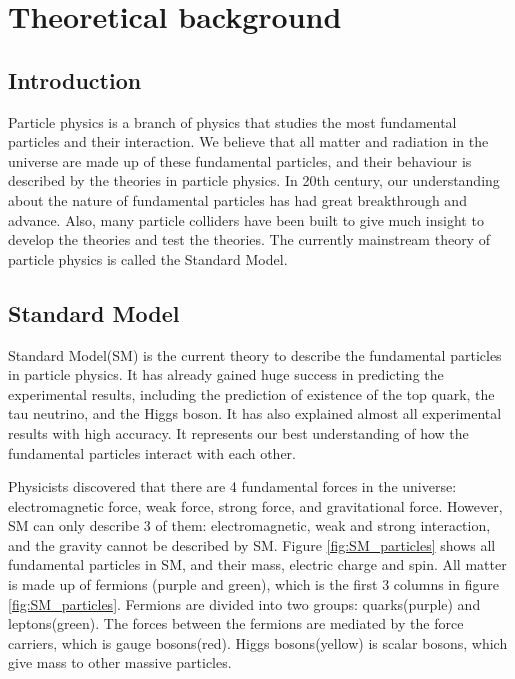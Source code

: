 \chapter{Theoretical background}
\label{ch:theory}

\section{Introduction}
Particle physics is a branch of physics that studies the most fundamental particles and their interaction.
We believe that all matter and radiation in the universe are made up of these fundamental particles, and their behaviour is described by the theories in particle physics.
In 20th century, our understanding about the nature of fundamental particles has had great breakthrough and  advance.
Also, many particle colliders have been built to give much insight to develop the theories and test the theories.
The currently mainstream theory of particle physics is called the Standard Model.

\section{Standard Model}
\label{sec:Standard_Model}
Standard Model(SM) is the current theory to describe the fundamental particles in particle physics.
It has already gained huge success in predicting the experimental results, including the prediction of existence of the top quark, the tau neutrino, and the Higgs boson.
It has also explained almost all experimental results with high accuracy.
It represents our best understanding of how the fundamental particles interact with each other.

Physicists discovered that there are 4 fundamental forces in the universe: electromagnetic force, weak force, strong force, and gravitational force.
However, SM can only describe 3 of them: electromagnetic, weak and strong interaction, and the gravity cannot be described by SM.
Figure \ref{fig:SM_particles} shows all fundamental particles in SM, and their mass, electric charge and spin.
All matter is made up of fermions (purple and green), which is the first 3 columns in figure \ref{fig:SM_particles}.
Fermions are divided into two groups: quarks(purple) and leptons(green).
The forces between the fermions are mediated by the force carriers, which is gauge bosons(red).
Higgs bosons(yellow) is scalar bosons, which give mass to other massive particles.

